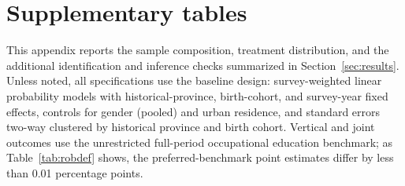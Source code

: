 
\appendix
\renewcommand{\thesection}{\Alph{section}}
\renewcommand{\thetable}{A\arabic{table}}
\renewcommand{\thefigure}{A\arabic{figure}}
\setcounter{table}{0}
\setcounter{figure}{0}

\section{Supplementary tables}
\label{app:robust}

This appendix reports the sample composition, treatment distribution, and the additional
identification and inference checks summarized in Section~\ref{sec:results}. Unless noted,
all specifications use the baseline design: survey-weighted linear probability models with
historical-province, birth-cohort, and survey-year fixed effects, controls for gender (pooled)
and urban residence, and standard errors two-way clustered by historical province and birth
cohort. Vertical and joint outcomes use the unrestricted full-period occupational education
benchmark; as Table~\ref{tab:robdef} shows, the preferred-benchmark point estimates differ by
less than 0.01 percentage points.

